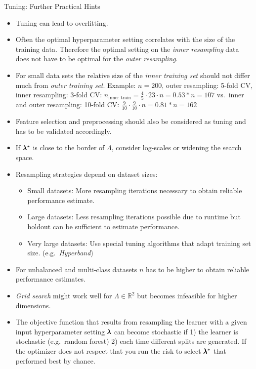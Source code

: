 \begin{frame}[allowframebreaks]{Tuning: Further Practical Hints}
\begin{itemize}
  \item Tuning can lead to overfitting.
  \item Often the optimal hyperparameter setting correlates with the size of the training data. Therefore the optimal setting on the \emph{inner resampling} data does not have to be optimal for the \emph{outer resampling}.
  \item For small data sets the relative size of the \emph{inner training set} should not differ much from \emph{outer training set}. Example: $n = 200$, outer resampling: 5-fold CV, inner resampling: 3-fold CV: $n_{\text{inner train}} = \frac{4}{5} \cdot {2}{3} \cdot n = 0.53 * n = 107$ vs.\ inner and outer resampling: 10-fold CV: $\frac{9}{10} \cdot \frac{9}{10} \cdot n = 0.81 * n = 162$ 
  \item Feature selection and preprocessing should also be considered as tuning and has to be validated accordingly.
  \item If $\pmb{\lambda}^\star$ is close to the border of $\Lambda$, consider log-scales or widening the search space.
  \item Resampling strategies depend on dataset sizes:
  \begin{itemize}
    \item Small datasets: More resampling iterations necessary to obtain reliable performance estimate.
    \item Large datasets: Less resampling iterations possible due to runtime but holdout can be sufficient to estimate performance.
    \item Very large datasets: Use special tuning algorithms that adapt training set size. (e.g.\ \emph{Hyperband})
  \end{itemize}
  \item For unbalanced and multi-class datasets $n$ has to be higher to obtain reliable performance estimates.
  \item \emph{Grid search} might work well for $\Lambda \in \mathbb{R}^2$ but becomes infeasible for higher dimensions.
  \item The objective function that results from resampling the learner with a given input hyperparameter setting $\pmb{\lambda}$ can become stochastic if 1) the learner is stochastic (e.g.\ random forest) 2) each time different splits are generated. If the optimizer does not respect that you run the risk to select $\pmb{\lambda}^\ast$ that performed best by chance.

\end{itemize}
\end{frame}
